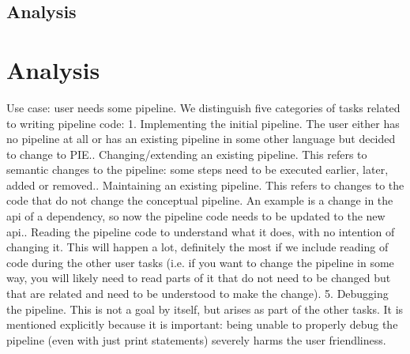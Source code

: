 
\subsection{Analysis}
\label{sec:evaluation__testing__analysis}


\section{Analysis}
\label{sec:evaluation__analysis}

Use case: user needs some pipeline.
We distinguish five categories of tasks related to writing pipeline code:
1. Implementing the initial pipeline. The user either has no pipeline at all or has an existing pipeline in some other language but decided to change to PIE.. Changing/extending an existing pipeline. This refers to semantic changes to the pipeline: some steps need to be executed earlier, later, added or removed.. Maintaining an existing pipeline. This refers to changes to the code that do not change the conceptual pipeline. An example is a change in the api of a dependency, so now the pipeline code needs to be updated to the new api.. Reading the pipeline code to understand what it does, with no intention of changing it. This will happen a lot, definitely the most if we include reading of code during the other user tasks (i.e. if you want to change the pipeline in some way, you will likely need to read parts of it that do not need to be changed but that are related and need to be understood to make the change).
5. Debugging the pipeline. This is not a goal by itself, but arises as part of the other tasks. It is mentioned explicitly because it is important: being unable to properly debug the pipeline (even with just print statements) severely harms the user friendliness.



